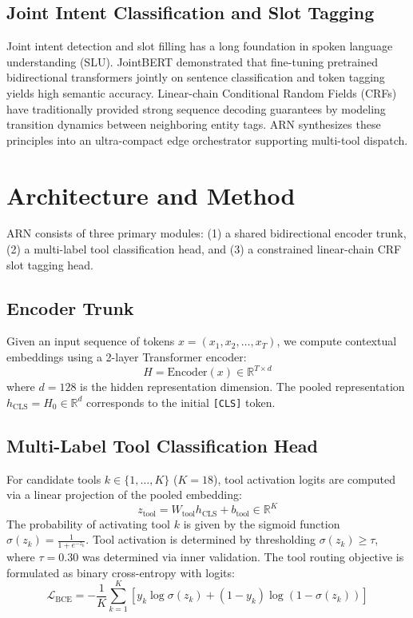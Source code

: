 \documentclass[letterpaper]{article}
\begin{document}
\subsection{Joint Intent Classification and Slot Tagging}
Joint intent detection and slot filling has a long foundation in spoken language understanding (SLU). JointBERT \citep{chen2019jointbert} demonstrated that fine-tuning pretrained bidirectional transformers jointly on sentence classification and token tagging yields high semantic accuracy. Linear-chain Conditional Random Fields (CRFs) \citep{lafferty2001crf} have traditionally provided strong sequence decoding guarantees by modeling transition dynamics between neighboring entity tags. ARN synthesizes these principles into an ultra-compact edge orchestrator supporting multi-tool dispatch.

\section{Architecture and Method}

ARN consists of three primary modules: (1) a shared bidirectional encoder trunk, (2) a multi-label tool classification head, and (3) a constrained linear-chain CRF slot tagging head.

\subsection{Encoder Trunk}
Given an input sequence of tokens $x = (x_1, x_2, \dots, x_T)$, we compute contextual embeddings using a 2-layer Transformer encoder:
\begin{equation}
    H = \text{Encoder}(x) \in \mathbb{R}^{T \times d}
\end{equation}
where $d = 128$ is the hidden representation dimension. The pooled representation $h_{\text{CLS}} = H_0 \in \mathbb{R}^d$ corresponds to the initial \texttt{[CLS]} token.

\subsection{Multi-Label Tool Classification Head}
For candidate tools $k \in \{1, \dots, K\}$ ($K=18$), tool activation logits are computed via a linear projection of the pooled embedding:
\begin{equation}
    z_{\text{tool}} = W_{\text{tool}} h_{\text{CLS}} + b_{\text{tool}} \in \mathbb{R}^K
\end{equation}
The probability of activating tool $k$ is given by the sigmoid function $\sigma(z_k) = \frac{1}{1 + e^{-z_k}}$. Tool activation is determined by thresholding $\sigma(z_k) \ge \tau$, where $\tau = 0.30$ was determined via inner validation. The tool routing objective is formulated as binary cross-entropy with logits:
\begin{equation}
    \mathcal{L}_{\text{BCE}} = -\frac{1}{K} \sum_{k=1}^K \left[ y_k \log \sigma(z_k) + (1 - y_k) \log (1 - \sigma(z_k)) \right]
\end{equation}
\end{document}
